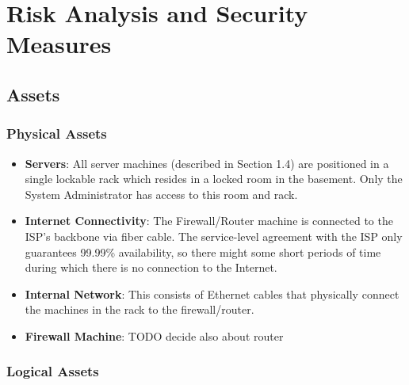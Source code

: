\documentclass[english]{article}
\begin{document}
\section{Risk Analysis and Security Measures}

\subsection{Assets}


\subsubsection{\textbf{Physical Assets}}
\begin{itemize}
\item \textbf{Servers}: All server machines (described in Section 1.4) are positioned in a single lockable rack which resides in a locked room in the basement. Only the System Administrator has access to this room and rack.
\item \textbf{Internet Connectivity}: The Firewall/Router machine is connected to the ISP's backbone via fiber cable. The service-level agreement with the ISP only guarantees 99.99\% availability, so there might some short
periods of time during which there is no connection to the Internet.
\item \textbf{Internal Network}: This consists of Ethernet cables that physically connect the machines in the rack to the firewall/router.
\item \textbf{Firewall Machine}: TODO decide also about router
\end{itemize}


\subsubsection{\textbf{Logical Assets}}
\end{document}
